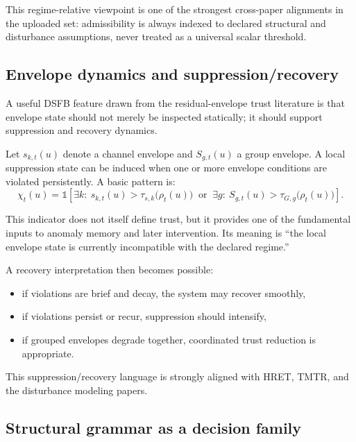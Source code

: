 \documentclass[11pt,letterpaper]{article}
\theoremstyle{gcresult}
\theoremstyle{definition}
\begin{document}
This regime-relative viewpoint is one of the strongest cross-paper alignments in the uploaded set: admissibility is always indexed to declared structural and disturbance assumptions, never treated as a universal scalar threshold. 


\subsection{Envelope dynamics and suppression/recovery}

A useful DSFB feature drawn from the residual-envelope trust literature is that envelope state should not merely be inspected statically; it should support suppression and recovery dynamics.

Let $s_{k,t}(u)$ denote a channel envelope and $S_{g,t}(u)$ a group envelope. A local suppression state can be induced when one or more envelope conditions are violated persistently. A basic pattern is:
\begin{equation}
\chi_t(u)=
\mathbb{1}\!\left[
\exists k:\ s_{k,t}(u)>\tau_{s,k}\bigl(\rho_t(u)\bigr)
\;\;\text{or}\;\;
\exists g:\ S_{g,t}(u)>\tau_{G,g}\bigl(\rho_t(u)\bigr)
\right].
\end{equation}

This indicator does not itself define trust, but it provides one of the fundamental inputs to anomaly memory and later intervention. Its meaning is “the local envelope state is currently incompatible with the declared regime.”

A recovery interpretation then becomes possible:
\begin{itemize}[leftmargin=1.5em]
    \item if violations are brief and decay, the system may recover smoothly,
    \item if violations persist or recur, suppression should intensify,
    \item if grouped envelopes degrade together, coordinated trust reduction is appropriate.
\end{itemize}

This suppression/recovery language is strongly aligned with HRET, TMTR, and the disturbance modeling papers. 


\subsection{Structural grammar as a decision family}
\end{document}
